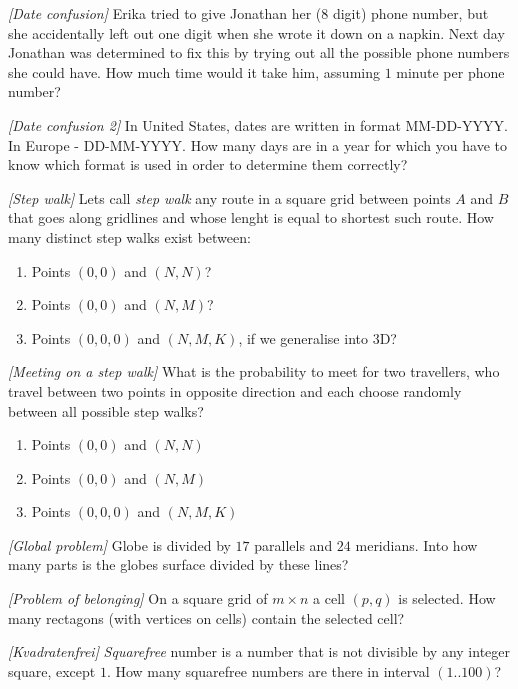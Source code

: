 \begin{problem}
\textit{[Date confusion]}
Erika tried to give Jonathan her ($8$ digit) phone number, but she accidentally left out one digit when she wrote it down on a napkin. Next day Jonathan was determined to fix this by trying out all the possible phone numbers she could have. How much time would it take him, assuming $1$ minute per phone number?
\end{problem}
%

\begin{problem}
\textit{[Date confusion 2]}
In United States, dates are written in format MM-DD-YYYY. In Europe - DD-MM-YYYY. How many days are in a year for which you have to know which format is used in order to determine them correctly?
\end{problem}

\begin{problem}
\textit{[Step walk]}
Lets call \textit{step walk} any route in a square grid between points $A$ and $B$ that goes along gridlines and whose lenght is equal to shortest such route. How many distinct step walks exist between:
\begin{enumerate}
\item Points $(0,0)$ and $(N,N)$?
\item Points $(0,0)$ and $(N,M)$?
\item Points $(0,0,0)$ and $(N,M,K)$, if we generalise into 3D?
\end{enumerate}
\end{problem}

\begin{problem}
\textit{[Meeting on a step walk]}
What is the probability to meet for two travellers, who travel between two points in opposite direction and each choose randomly between all possible step walks?
\begin{enumerate}
\item Points $(0,0)$ and $(N,N)$
\item Points $(0,0)$ and $(N,M)$
\item Points $(0,0,0)$ and $(N,M,K)$
\end{enumerate}
\end{problem}

\begin{problem}
\textit{[Global problem]}
Globe is divided by $17$ parallels and $24$ meridians. Into how many parts is the globes surface divided by these lines? 
\end{problem}
%

\begin{problem}
\textit{[Problem of belonging]}
On a square grid of $m \times n$ a cell $(p,q)$ is selected. How many rectagons (with vertices on cells) contain the selected cell?
\end{problem}
%

\begin{problem}
\textit{[Kvadratenfrei]}
\textit{Squarefree} number is a number that is not divisible by any integer square, except $1$. How many squarefree numbers are there in interval $(1..100)$?
\end{problem}
%

